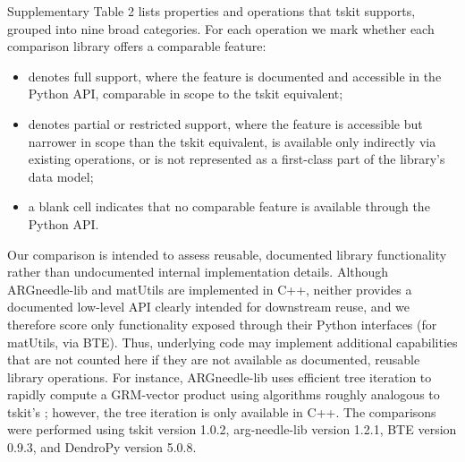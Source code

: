 \documentclass{article}
\begin{document}
Supplementary Table 2 lists properties and operations that tskit supports, grouped
into nine broad categories.
For each operation we mark whether each comparison library offers a
comparable feature:
\begin{itemize}
\item[\checkmark{}] denotes full support, where the feature is
documented and accessible in the Python API, comparable in scope to
the tskit equivalent;
\item[$\circ$] denotes partial or restricted support, where the
feature is accessible but narrower in scope than the tskit
equivalent, is available only indirectly via existing operations, or
is not represented as a first-class part of the library's data model;
\item[] a blank cell indicates that no comparable feature is
available through the Python API.
\end{itemize}
Our comparison is intended to assess reusable, documented library
functionality rather than undocumented internal implementation
details.
Although ARGneedle-lib and matUtils are implemented in C++, neither
provides a documented low-level API clearly intended for downstream reuse, and
we therefore score only functionality exposed through their Python
interfaces (for matUtils, via BTE).
Thus, underlying code may implement additional capabilities that are
not counted here if they are not available as documented, reusable
library operations.
For instance, ARGneedle-lib uses efficient tree iteration
to rapidly compute a GRM-vector product
using algorithms roughly analogous to tskit's \citep[described in][]{zhu2024fastvariancecomponent};
however, the tree iteration is only available in C++.
The comparisons were performed using tskit version 1.0.2,
arg-needle-lib version 1.2.1, BTE version 0.9.3, and DendroPy version 5.0.8.

\clearpage



\end{document}

